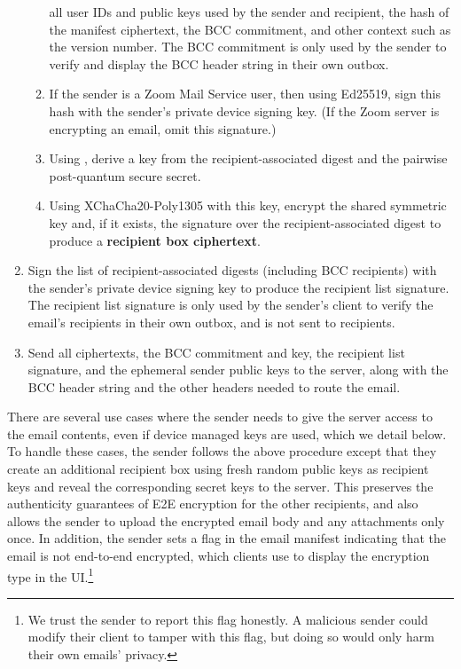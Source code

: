 \begin{enumerate}
\begin{enumerate}
all user IDs and public keys used by the sender and recipient, the hash of the manifest ciphertext,
the BCC commitment, and other context such as the version number. The BCC commitment is only used by
the sender to verify and display the BCC header string in their own outbox.
\item If the sender is a Zoom Mail Service user, then using Ed25519, sign this hash with the
sender's private device signing key. (If the Zoom server is encrypting an email, omit this
signature.)
\item Using \HMACSHATWO, derive a key from the recipient-associated digest and the pairwise post-quantum
secure secret.
\item Using XChaCha20-Poly1305 with this key, encrypt the shared symmetric key and, if it exists,
the signature over the recipient-associated digest to produce a \textbf{recipient box ciphertext}.
\end{enumerate}
\item Sign the list of recipient-associated digests (including BCC recipients) with the sender's
private device signing key to produce the recipient list signature. The recipient list signature is
only used by the sender's client to verify the email's recipients in their own outbox, and is not
sent to recipients.
\item Send all ciphertexts, the BCC commitment and key, the recipient list signature, and the
ephemeral sender public keys to the server, along with the BCC header string and the other headers
needed to route the email.
\end{enumerate}

There are several use cases where the sender needs to give the server access to the email contents,
even if device managed keys are used, which we detail below. To handle these cases, the sender
follows the above procedure except that they create an additional recipient box using fresh random
public keys as recipient keys and reveal the corresponding secret keys to the server. This
preserves the authenticity guarantees of E2E encryption for the other recipients, and also allows
the sender to upload the encrypted email body and any attachments only once. In addition, the sender
sets a flag in the email manifest indicating that the email is not end-to-end encrypted, which
clients use to display the encryption type in the UI.\footnote{We trust the sender to report this
flag honestly. A malicious sender could modify their client to tamper with this flag, but doing so
would only harm their own emails' privacy.}


